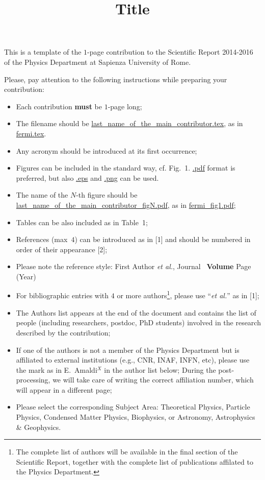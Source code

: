 \documentclass[twocolumn,twoside,10pt,nodate]{article}
\newcommand{\titolo}[2]{\title{\Large\bf\vspace{-1cm}#1}}
\begin{document}

\titolo{Title}


\date{}%
\maketitle
\thispagestyle{fancy} %


This is a template of the $1$-page contribution to the Scientific Report 2014-2016 of the Physics Department at Sapienza University of Rome. 

Please, pay attention to the following instructions while preparing your contribution:

\begin{itemize}
 \item Each contribution {\bf must} be $1$-page long;
 \item The filename should be \url{last_name_of_the_main_contributor.tex}, as in \url{fermi.tex}.
 \item Any acronym should be introduced at its first occurrence;
 \item Figures can be included in the standard way, cf. Fig.~1. \url{.pdf} format is preferred, but also \url{.eps} and \url{.png} can be used. 
 \item The name of the $N$-th figure should be \url{last_name_of_the_main_contributor_figN.pdf}, as in \url{fermi_fig1.pdf};
 \item Tables can be also included as in Table~1;
 \item References (max~$4$) can be introduced as in [1] and should be numbered in order of their appearance [2];
 \item Please note the reference style: First Author \textit{et al.}, Journal \ \textbf{Volume} Page (Year)
 \item For bibliographic entries with $4$ or more authors\footnote{The complete list of authors will be available in the final section of the Scientific Report, together with the complete list of publications affilated to the Physics Department.}, please use ``\textit{et al.}'' as in [1];
 \item The Authors list appears at the end of the document and contains the list of people (including researchers, postdoc, PhD students) involved in the research described by the contribution;
 \item If one of the authors is not a member of the Physics Department but is affiliated to external institutions (e.g., CNR, INAF, INFN, etc), please use the mark as in E.~Amaldi$^X$ in the author list below;  During the post-processing, we will take care of writing the correct affiliation number, which will appear in a different page;
 \item Please select the corresponding Subject Area: Theoretical Physics, Particle Physics, Condensed Matter Physics, Biophysics, or Astronomy, Astrophysics \& Geophysics.
\end{itemize}
\end{document}
